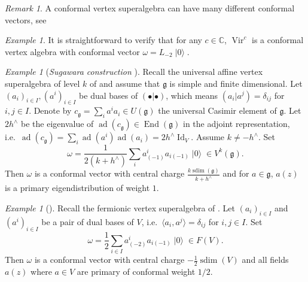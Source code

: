\documentclass[a4paper, 12pt, reqno]{amsart}
\theoremstyle{remark}
\newtheorem{remark}[theorem]{Remark}
\newtheorem{example}[theorem]{Example}
\numberwithin{equation}{subsection}
\DeclareMathOperator{\Vir}{Vir}
\DeclareMathOperator{\Id}{Id}
\DeclareMathOperator{\End}{End}
\DeclareMathOperator{\vac}{|0\rangle}
\DeclareMathOperator{\ad}{ad}
\DeclareMathOperator{\sdim}{sdim}
\begin{document}
\begin{remark}
  \label{rmk:20}
  A conformal vertex superalgebra can have many different conformal vectors, see \cite[Example 2.5.9]{frenkel_vertex_2001}
\end{remark}

\begin{example}
  \label{exa:8}
  It is straightforward to verify that for any $c \in \mathbb{C}$, $\Vir^c$ is a conformal vertex algebra with conformal vector $\omega = L_{-2}\vac$.
\end{example}

\begin{example}[\emph{Sugawara construction} {\cite[Theorem 5.7]{kac_vertex_1998}}]
  \label{exa:9}
  Recall the universal affine vertex superalgebra of level $k$ of  and assume that $\mathfrak{g}$ is simple and finite dimensional.
  Let $(a_i)_{i \in I}, (a^i)_{i \in I}$ be dual bases of $(\bullet| \bullet)$, which means $(a_i| a^j) = \delta_{ij}$ for $i, j \in I$.
  Denote by $c_{\mathfrak{g}} = \sum_ia^ia_i \in U(\mathfrak{g})$ the universal Casimir element of $\mathfrak{g}$.
  Let $2h^{\wedge}$ be the eigenvalue of $\ad(c_{\mathfrak{g}}) \in \End(\mathfrak{g})$ in the adjoint representation, i.e.\ $\ad(c_{\mathfrak{g}}) = \sum_i\ad(a^i)\ad(a_i) = 2h^{\wedge}\Id_V$.
  Assume $k \neq -h^\wedge$.
  Set
  \begin{equation*}
    \omega = \frac{1}{2(k + h^\wedge)}\sum_ia^i_{(-1)}a_{i(-1)}\vac \in V^k(\mathfrak{g}).
  \end{equation*}
  Then $\omega$ is a conformal vector with central charge $\frac{k\sdim(\mathfrak{g})}{k + h^{\wedge}}$ and for $a \in \mathfrak{g}$, $a(z)$ is a primary eigendistribution of weight $1$.
\end{example}

\begin{example}[{\cite[Proposition 4.10]{kac_vertex_1998}}]
  \label{exa:10}
  Recall the fermionic vertex superalgebra of .
  Let $(a_i)_{i \in I}$ and $(a^i)_{i \in I}$ be a pair of dual bases of $V$, i.e.\ $\langle a_i, a^j\rangle = \delta_{ij}$ for $i, j \in I$.
  Set
  \begin{equation*}
    \omega = \frac{1}{2}\sum_{i \in I}a^i_{(-2)}a_{i(-1)}\vac \in F(V).
  \end{equation*}
  Then $\omega$ is a conformal vector with central charge $-\frac{1}{2}\sdim(V)$ and all fields $a(z)$ where $a \in V$ are primary of conformal weight $1/2$.
\end{example}
\end{document}
